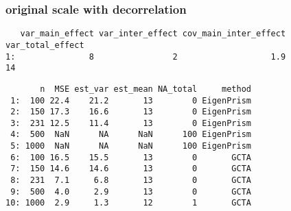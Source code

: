 \documentclass[]{article}
\begin{document}
\subsubsection{original scale with
decorrelation}\label{original-scale-with-decorrelation-1}

\begin{verbatim}
   var_main_effect var_inter_effect cov_main_inter_effect var_total_effect
1:               8                2                   1.9               14
\end{verbatim}

\begin{verbatim}
       n  MSE est_var est_mean NA_total     method
 1:  100 22.4    21.2       13        0 EigenPrism
 2:  150 17.3    16.6       13        0 EigenPrism
 3:  231 12.5    11.4       13        0 EigenPrism
 4:  500  NaN      NA      NaN      100 EigenPrism
 5: 1000  NaN      NA      NaN      100 EigenPrism
 6:  100 16.5    15.5       13        0       GCTA
 7:  150 14.6    14.6       13        0       GCTA
 8:  231  7.1     6.8       13        0       GCTA
 9:  500  4.0     2.9       13        0       GCTA
10: 1000  2.9     1.3       12        1       GCTA
\end{verbatim}
\end{document}
